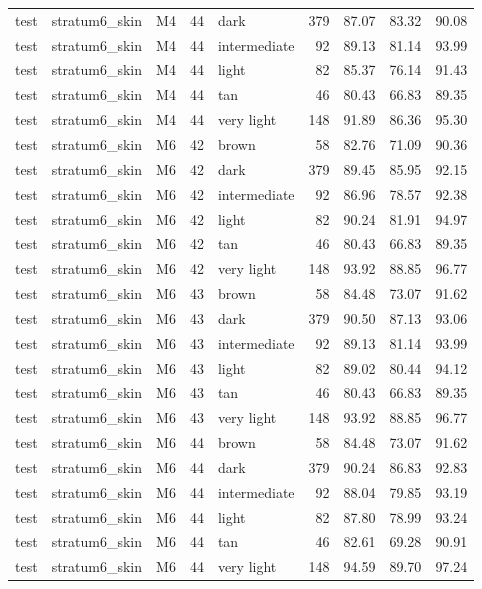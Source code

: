 \begin{tabular}{lllrlrrrr}
test & stratum6\_skin & M4 & 44 & dark & 379 & 87.07 & 83.32 & 90.08 \\
test & stratum6\_skin & M4 & 44 & intermediate & 92 & 89.13 & 81.14 & 93.99 \\
test & stratum6\_skin & M4 & 44 & light & 82 & 85.37 & 76.14 & 91.43 \\
test & stratum6\_skin & M4 & 44 & tan & 46 & 80.43 & 66.83 & 89.35 \\
test & stratum6\_skin & M4 & 44 & very light & 148 & 91.89 & 86.36 & 95.30 \\
test & stratum6\_skin & M6 & 42 & brown & 58 & 82.76 & 71.09 & 90.36 \\
test & stratum6\_skin & M6 & 42 & dark & 379 & 89.45 & 85.95 & 92.15 \\
test & stratum6\_skin & M6 & 42 & intermediate & 92 & 86.96 & 78.57 & 92.38 \\
test & stratum6\_skin & M6 & 42 & light & 82 & 90.24 & 81.91 & 94.97 \\
test & stratum6\_skin & M6 & 42 & tan & 46 & 80.43 & 66.83 & 89.35 \\
test & stratum6\_skin & M6 & 42 & very light & 148 & 93.92 & 88.85 & 96.77 \\
test & stratum6\_skin & M6 & 43 & brown & 58 & 84.48 & 73.07 & 91.62 \\
test & stratum6\_skin & M6 & 43 & dark & 379 & 90.50 & 87.13 & 93.06 \\
test & stratum6\_skin & M6 & 43 & intermediate & 92 & 89.13 & 81.14 & 93.99 \\
test & stratum6\_skin & M6 & 43 & light & 82 & 89.02 & 80.44 & 94.12 \\
test & stratum6\_skin & M6 & 43 & tan & 46 & 80.43 & 66.83 & 89.35 \\
test & stratum6\_skin & M6 & 43 & very light & 148 & 93.92 & 88.85 & 96.77 \\
test & stratum6\_skin & M6 & 44 & brown & 58 & 84.48 & 73.07 & 91.62 \\
test & stratum6\_skin & M6 & 44 & dark & 379 & 90.24 & 86.83 & 92.83 \\
test & stratum6\_skin & M6 & 44 & intermediate & 92 & 88.04 & 79.85 & 93.19 \\
test & stratum6\_skin & M6 & 44 & light & 82 & 87.80 & 78.99 & 93.24 \\
test & stratum6\_skin & M6 & 44 & tan & 46 & 82.61 & 69.28 & 90.91 \\
test & stratum6\_skin & M6 & 44 & very light & 148 & 94.59 & 89.70 & 97.24 \\

\end{tabular}
